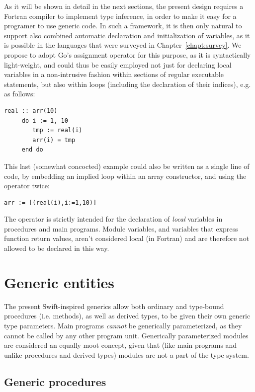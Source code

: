 \documentclass[11pt,oneside]{report}
\newcommand{\code}[1]{{\selectfont\ttfamily{#1}}}
\begin{document}
As it will be shown in detail in the next sections, the present design
requires a Fortran compiler to implement type inference, in order to
make it easy for a programer to use generic code. In such a framework,
it is then only natural to support also combined automatic declaration
and initialization of variables, as it is possible in the languages
that were surveyed in Chapter~\ref{chapt:survey}. We propose to adopt
Go's \code{:=} assignment operator for this purpose, as it is
syntactically light-weight, and could thus be easily employed not just
for declaring local variables in a non-intrusive fashion within
sections of regular executable statements, but also within loops
(including the declaration of their indices), e.g. as follows:
\begin{lstlisting}[language=LFortran,style=boxed]
     real :: arr(10)
     do i := 1, 10
        tmp := real(i)
        arr(i) = tmp
     end do
\end{lstlisting}
This last (somewhat concocted) example could also be written as a
single line of code, by embedding an implied \code{do} loop within an
array constructor, and using the \code{:=} operator twice:
\begin{lstlisting}[language=LFortran,style=boxed]
     arr := [(real(i),i:=1,10)]
\end{lstlisting}
The \code{:=} operator is strictly intended for the declaration of
\emph{local} variables in procedures and main programs. Module
variables, and variables that express function return values, aren't
considered local (in Fortran) and are therefore not allowed to be
declared in this way.

\section{Generic entities}
\label{sect:generic_parameters}

The present Swift-inspired generics allow both ordinary and type-bound
procedures (i.e. methods), as well as derived types, to be given their
own generic type parameters. Main programs \emph{cannot} be
generically parameterized, as they cannot be called by any other
program unit. Generically parameterized modules are considered an
equally moot concept, given that (like main programs and unlike
procedures and derived types) modules are not a part of the type
system.

\subsection{Generic procedures}
\label{sect:generic_procedures}
\end{document}
